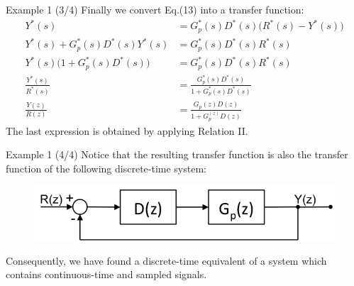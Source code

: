 \begin{frame}
	\begin{exampleblock}{Example 1 (3/4)}
		Finally we convert Eq.(13) into a transfer function:
		\begin{align*}
		Y^{*}(s) &= G_p^{*}(s)D^{*}(s) \big ( R^{*}(s) - Y^{*}(s) \big)\\
		Y^{*}(s) + G_p^{*}(s)D^{*}(s)Y^{*}(s) &= G_p^{*}(s)D^{*}(s)R^{*}(s)\\
		Y^{*}(s) \big (1 +  G_p^{*}(s)D^{*}(s) \big) &= G_p^{*}(s)D^{*}(s)R^{*}(s)\\
		\frac{Y^{*}(s)}{R^{*}(s)} &= \frac{G_p^{*}(s)D^{*}(s)}{1 +  G_p^{*}(s)D^{*}(s)}\\
		\frac{Y(z)}{R(z)} &= \frac{G_p(z)D(z)}{1 +  G_p^(z)D(z)}
		\end{align*}
		The last expression is obtained by applying Relation II.
	\end{exampleblock}
\end{frame}

\begin{frame}
	\begin{exampleblock}{Example 1 (4/4)}
		\justify		
		Notice that the resulting transfer function is also the transfer function of the following discrete-time system:
		\begin{figure}
			\centering
			\includegraphics[width=0.8\linewidth]{block_analysis_3}
		\end{figure}
		Consequently, we have found a discrete-time equivalent of a system which contains continuous-time and sampled signals.
	\end{exampleblock}
\end{frame}

